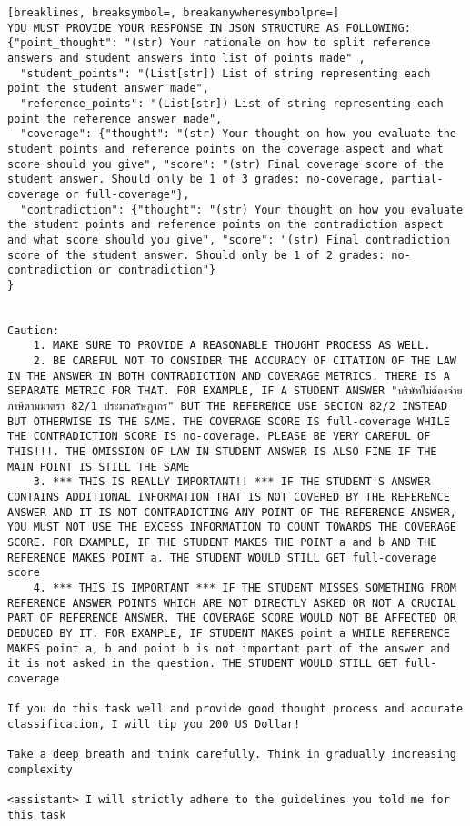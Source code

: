 \begin{Verbatim}[breaklines, breaksymbol=, breakanywheresymbolpre=]
YOU MUST PROVIDE YOUR RESPONSE IN JSON STRUCTURE AS FOLLOWING:
{"point_thought": "(str) Your rationale on how to split reference answers and student answers into list of points made" ,
  "student_points": "(List[str]) List of string representing each point the student answer made",
  "reference_points": "(List[str]) List of string representing each point the reference answer made",
  "coverage": {"thought": "(str) Your thought on how you evaluate the student points and reference points on the coverage aspect and what score should you give", "score": "(str) Final coverage score of the student answer. Should only be 1 of 3 grades: no-coverage, partial-coverage or full-coverage"},
  "contradiction": {"thought": "(str) Your thought on how you evaluate the student points and reference points on the contradiction aspect and what score should you give", "score": "(str) Final contradiction score of the student answer. Should only be 1 of 2 grades: no-contradiction or contradiction"}
}


Caution:
    1. MAKE SURE TO PROVIDE A REASONABLE THOUGHT PROCESS AS WELL.
    2. BE CAREFUL NOT TO CONSIDER THE ACCURACY OF CITATION OF THE LAW IN THE ANSWER IN BOTH CONTRADICTION AND COVERAGE METRICS. THERE IS A SEPARATE METRIC FOR THAT. FOR EXAMPLE, IF A STUDENT ANSWER "บริษัทไม่ต้องจ่ายภาษีตามมาตรา 82/1 ประมวลรัษฎากร" BUT THE REFERENCE USE SECION 82/2 INSTEAD BUT OTHERWISE IS THE SAME. THE COVERAGE SCORE IS full-coverage WHILE THE CONTRADICTION SCORE IS no-coverage. PLEASE BE VERY CAREFUL OF THIS!!!. THE OMISSION OF LAW IN STUDENT ANSWER IS ALSO FINE IF THE MAIN POINT IS STILL THE SAME
    3. *** THIS IS REALLY IMPORTANT!! *** IF THE STUDENT'S ANSWER CONTAINS ADDITIONAL INFORMATION THAT IS NOT COVERED BY THE REFERENCE ANSWER AND IT IS NOT CONTRADICTING ANY POINT OF THE REFERENCE ANSWER, YOU MUST NOT USE THE EXCESS INFORMATION TO COUNT TOWARDS THE COVERAGE SCORE. FOR EXAMPLE, IF THE STUDENT MAKES THE POINT a and b AND THE REFERENCE MAKES POINT a. THE STUDENT WOULD STILL GET full-coverage score
    4. *** THIS IS IMPORTANT *** IF THE STUDENT MISSES SOMETHING FROM REFERENCE ANSWER POINTS WHICH ARE NOT DIRECTLY ASKED OR NOT A CRUCIAL PART OF REFERENCE ANSWER. THE COVERAGE SCORE WOULD NOT BE AFFECTED OR DEDUCED BY IT. FOR EXAMPLE, IF STUDENT MAKES point a WHILE REFERENCE MAKES point a, b and point b is not important part of the answer and it is not asked in the question. THE STUDENT WOULD STILL GET full-coverage

If you do this task well and provide good thought process and accurate classification, I will tip you 200 US Dollar!
    
Take a deep breath and think carefully. Think in gradually increasing complexity

<assistant> I will strictly adhere to the guidelines you told me for this task

\end{Verbatim}


